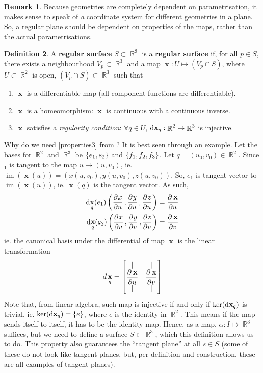 \documentclass{amsart} %
\theoremstyle{mytheoremstyle}
\theoremstyle{definition}
\newtheorem{definition}{Definition}[section]
\newtheorem{remark}[definition]{Remark}
\numberwithin{equation}{section}
\DeclareMathOperator{\R}{\mathbb{R}}
\DeclareMathOperator{\1}{\mathbbm{1}}
\DeclareMathOperator{\im}{im}
\DeclareMathOperator{\D}{\dif}
\DeclareMathOperator{\x}{\mathbf{x}}
\begin{document}
\begin{remark}
	\label{remcoordinatesystemparametrisation}
	Because geometries are completely dependent on parametrisation, it makes sense to speak of \textit{a} coordinate system for different geometries in a plane. So, a regular plane should be dependent on properties of the maps, rather than the actual parametrisations.
\end{remark}


\begin{definition}
	\label{defregularsurfaces}
	A \textbf{regular surface} $S \subset \R^3$ is a \textbf{regular surface} if, for all $p \in S$, there exists a neighbourhood $V_p \subset \R^3$ and a map $\x:U \mapsto (V_p \cap S)$, where $U \subset \R^2$ is open, $(V_p \cap S) \subset \R^3$ such that
	\begin{enumerate}
		\item \label{properties1} $\x$ is a differentiable map (all component functions are differentiable).
		\item \label{properties2} $\x$ is a homeomorphism: $\x$ is continuous with a continuous inverse.
		\item \label{properties3} $\x$ satisfies a \textit{regularity condition}: $\forall q \in U$, $\D \x_q: \R^2 \mapsto \R^3$ is injective.
	\end{enumerate}
\end{definition}

Why do we need \eqref{properties3} from ? It is best seen through an example. Let the bases for $\R^2$ and $\R^3$ be $\set{e_1,e_2}$ and $\set{f_1,f_2,f_3}$. Let $q = (u_0,v_0) \in \R^2$. Since $_1$ is tangent to the map $u \to (u,v_0)$, ie. $\im(\x (u))= (x(u,v_0),y(u,v_0),z(u,v_0))$. So, $e_1$ is tangent vector to $\im (\x (u))$, ie. $\x(q)$ is the tangent vector. As such,
\begin{align*}
	\D \x_q (e_1) \left( \dpd{x}{u} , \dpd{y}{u} , \dpd{z}{u} \right) &= \dpd{\x}{u}  \\
	\D \x_q (e_2) \left( \dpd{x}{v} , \dpd{y}{v} , \dpd{z}{v} \right) &= \dpd{\x}{v}
\end{align*}
ie. the canonical basis under the differential of map $\x$ is the linear transformation
\begin{align*}
d \x_q = \begin{bmatrix*}[c]
\vert & \vert \\
\dpd{\x}{u} & \dpd{\x}{v} \\
\vert & \vert 
\end{bmatrix*}
\end{align*}
Note that, from linear algebra, such map is injective if and only if $\ker (\D \x_q)$ is trivial, ie. $\ker (\D \x_q) = \set{e}$, where $e$ is the identity in $\R^2$. This means if the map sends itself to itself, it has to be the identity map. Hence, as a map, $\alpha: I \mapsto \R^3$ suffices, but we need to define a surface $S \subset \R^3$, which this definition allows us to do. This property also guarantees the ``tangent plane'' at all $s \in S$ (some of these do not look like tangent planes, but, per definition and construction, these are all examples of tangent planes).
\end{document}
